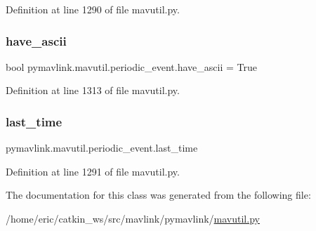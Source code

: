 Definition at line 1290 of file mavutil.\+py.

\mbox{\label{classpymavlink_1_1mavutil_1_1periodic__event_a13096fa6189e3999bcf9f4d881f269e0}} 
\subsubsection{\texorpdfstring{have\_ascii}{have\_ascii}}
{\footnotesize\ttfamily bool pymavlink.\+mavutil.\+periodic\+\_\+event.\+have\+\_\+ascii = True\hspace{0.3cm}{\ttfamily [static]}}



Definition at line 1313 of file mavutil.\+py.

\mbox{\label{classpymavlink_1_1mavutil_1_1periodic__event_ab270b81812ba5bdd088a807ed240d8f5}} 
\subsubsection{\texorpdfstring{last\_time}{last\_time}}
{\footnotesize\ttfamily pymavlink.\+mavutil.\+periodic\+\_\+event.\+last\+\_\+time}



Definition at line 1291 of file mavutil.\+py.



The documentation for this class was generated from the following file\+:\begin{DoxyCompactItemize}
\item 
/home/eric/catkin\+\_\+ws/src/mavlink/pymavlink/\mbox{\hyperlink{mavutil_8py}{mavutil.\+py}}\end{DoxyCompactItemize}
